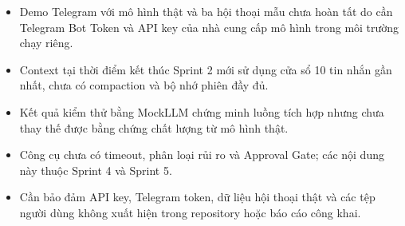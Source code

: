 \documentclass[12pt,a4paper]{article}
\begin{document}
\begin{itemize}
    \item Demo Telegram với mô hình thật và ba hội thoại mẫu chưa hoàn tất do cần Telegram Bot Token và API key của nhà cung cấp mô hình trong môi trường chạy riêng.

    \item Context tại thời điểm kết thúc Sprint 2 mới sử dụng cửa sổ 10 tin nhắn gần nhất, chưa có compaction và bộ nhớ phiên đầy đủ.

    \item Kết quả kiểm thử bằng MockLLM chứng minh luồng tích hợp nhưng chưa thay thế được bằng chứng chất lượng từ mô hình thật.

    \item Công cụ chưa có timeout, phân loại rủi ro và Approval Gate; các nội dung này thuộc Sprint 4 và Sprint 5.

    \item Cần bảo đảm API key, Telegram token, dữ liệu hội thoại thật và các tệp người dùng không xuất hiện trong repository hoặc báo cáo công khai.
\end{itemize}
\end{document}
